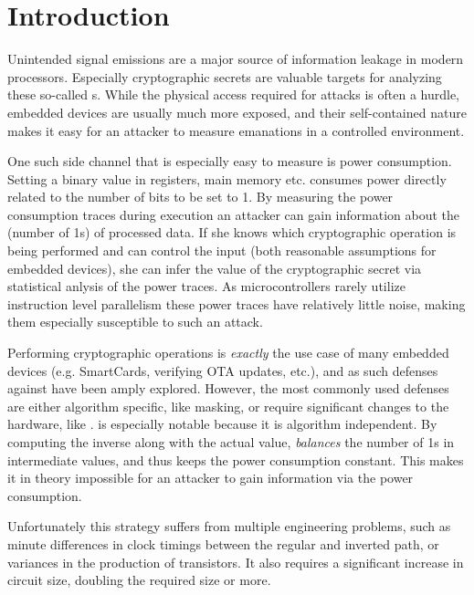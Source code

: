 \section{Introduction}
Unintended signal emissions are a major source of information leakage in modern processors.
Especially cryptographic secrets are valuable targets for analyzing these so-called \sidechannel{}s.
While the physical access required for \sidechannel{} attacks is often a hurdle, embedded devices are usually much more exposed, and their self-contained nature makes it easy for an attacker to measure \sidechannel{} emanations in a controlled environment.

One such side channel that is especially easy to measure is power consumption.
Setting a binary value in registers, main memory etc. consumes power directly related to the number of bits to be set to 1\cite{brier2004correlation}.
By measuring the power consumption traces during execution an attacker can gain information about the \hammingw{} (number of 1s) of processed data.
If she knows which cryptographic operation is being performed and can control the input (both reasonable assumptions for embedded devices), she can infer the value of the cryptographic secret via statistical anlysis of the power traces.\cite{brier2004correlation}
As microcontrollers rarely utilize instruction level parallelism these power traces have relatively little noise, making them especially susceptible to such an attack.

Performing cryptographic operations is \emph{exactly} the use case of many embedded devices (e.g. SmartCards, verifying OTA updates, etc.), and as such defenses against \poweranalysis{} have been amply explored.
However, the most commonly used defenses are either algorithm specific, like masking, or require significant changes to the hardware, like \dual{}\cite{sokolov2005design}.
\dual{} is especially notable because it is algorithm independent.
By computing the inverse along with the actual value, \dual{} \emph{balances} the number of 1s in intermediate values, and thus keeps the power consumption constant.
This makes it in theory impossible for an attacker to gain information via the power consumption.

Unfortunately this strategy suffers from multiple engineering problems, such as minute differences in clock timings between the regular and inverted path\cite{baddam2008path}, or variances in the production of transistors\cite{razafindraibe2006formal}.
It also requires a significant increase in circuit size, doubling the required size or more\cite{baddam2008path}.

